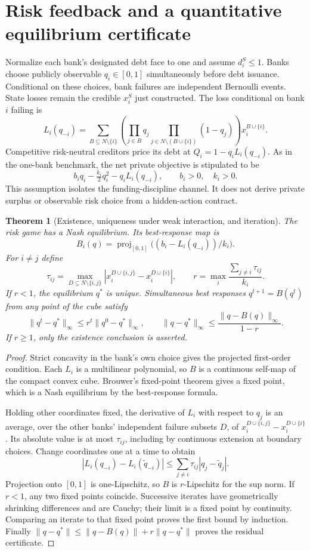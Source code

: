 \documentclass[11pt]{article}
\newtheorem{theorem}{Theorem}
\theoremstyle{definition}
\begin{document}
\section*{Risk feedback and a quantitative equilibrium certificate}
Normalize each bank's designated debt face to one and assume $d_i^S\leq1$.
Banks choose publicly observable $q_i\in[0,1]$ simultaneously before debt
issuance. Conditional on these choices, bank failures are independent
Bernoulli events. State losses remain the credible $x_i^S$ just constructed.
The loss conditional on bank $i$ failing is
\[
 L_i(q_{-i})=\sum_{B\subseteq N\setminus\{i\}}
 \left(\prod_{j\in B}q_j\prod_{j\in N\setminus(B\cup\{i\})}(1-q_j)\right)
 x_i^{B\cup\{i\}}.
\]
Competitive risk-neutral creditors price its debt at
$Q_i=1-q_iL_i(q_{-i})$. As in the one-bank benchmark, the net private objective
is stipulated to be
\[
 b_iq_i-\tfrac{k_i}{2}q_i^2-q_iL_i(q_{-i}),\qquad b_i>0,\quad k_i>0.
\]
This assumption isolates the funding-discipline channel. It does not derive
private surplus or observable risk choice from a hidden-action contract.

\begin{theorem}[Existence, uniqueness under weak interaction, and iteration]
The risk game has a Nash equilibrium. Its best-response map is
\[
 B_i(q)=\operatorname{proj}_{[0,1]}
             \bigl((b_i-L_i(q_{-i}))/k_i\bigr).
\]
For $i\ne j$ define
\[
 \tau_{ij}=\max_{D\subseteq N\setminus\{i,j\}}
 \left|x_i^{D\cup\{i,j\}}-x_i^{D\cup\{i\}}\right|,
 \qquad r=\max_i\frac{\sum_{j\ne i}\tau_{ij}}{k_i}.
\]
If $r<1$, the equilibrium $q^*$ is unique. Simultaneous best responses
$q^{t+1}=B(q^t)$ from any point of the cube satisfy
\[
 \|q^t-q^*\|_\infty\leq r^t\|q^0-q^*\|_\infty,
 \qquad
 \|q-q^*\|_\infty\leq\frac{\|q-B(q)\|_\infty}{1-r}.
\]
If $r\geq1$, only the existence conclusion is asserted.
\end{theorem}
\begin{proof}
Strict concavity in the bank's own choice gives the projected first-order
condition. Each $L_i$ is a multilinear polynomial, so $B$ is a continuous
self-map of the compact convex cube. Brouwer's fixed-point theorem gives a
fixed point, which is a Nash equilibrium by the best-response formula.

Holding other coordinates fixed, the derivative of $L_i$ with respect to
$q_j$ is an average, over the other banks' independent failure subsets $D$,
of $x_i^{D\cup\{i,j\}}-x_i^{D\cup\{i\}}$. Its absolute value is at most
$\tau_{ij}$, including by continuous extension at boundary choices.
Change coordinates one at a time to obtain
\[
 |L_i(q_{-i})-L_i(\widetilde q_{-i})|
     \leq\sum_{j\ne i}\tau_{ij}|q_j-\widetilde q_j|.
\]
Projection onto $[0,1]$ is one-Lipschitz, so $B$ is $r$-Lipschitz for the
sup norm. If $r<1$, any two fixed points coincide. Successive iterates have
geometrically shrinking differences and are Cauchy; their limit is a fixed
point by continuity. Comparing an iterate to that fixed point proves the
first bound by induction. Finally
$\|q-q^*\|\leq\|q-B(q)\|+r\|q-q^*\|$ proves the residual certificate.
\end{proof}
\end{document}
